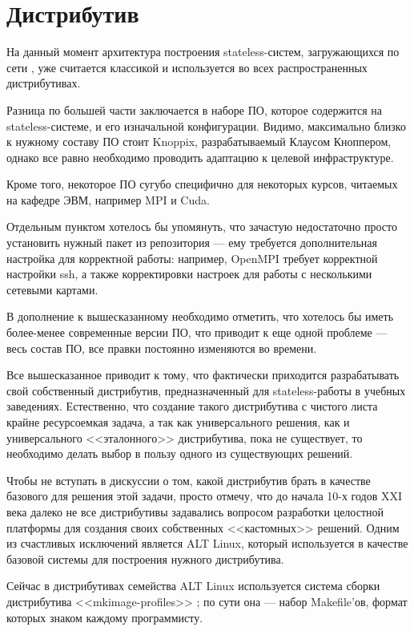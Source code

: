 \documentclass[10pt, a5paper]{article}
\begin{document}
\section*{Дистрибутив}

На данный момент архитектура построения stateless-систем, загружающихся по сети \cite{P01},  уже считается классикой и используется во всех распространенных дистрибутивах.

Разница по большей части заключается в наборе ПО, которое содержится на stateless-системе, и его изначальной конфигурации. Видимо, максимально близко к нужному составу ПО стоит Knoppix, разрабатываемый Клаусом Кноппером, однако все равно необходимо проводить адаптацию к целевой инфраструктуре.

Кроме того, некоторое ПО сугубо специфично для некоторых курсов, читаемых на кафедре ЭВМ, например MPI и Cuda.

Отдельным пунктом хотелось бы упомянуть, что зачастую недостаточно просто установить нужный пакет из репозитория --- ему требуется дополнительная настройка для корректной работы: например, OpenMPI требует корректной настройки ssh, а также корректировки настроек для работы с несколькими сетевыми картами.

В дополнение к вышесказанному необходимо отметить, что хотелось бы иметь более-менее современные версии ПО, что приводит к еще одной проблеме --- весь состав ПО, все правки постоянно изменяются во времени.

Все вышесказанное приводит к тому, что фактически приходится разрабатывать свой собственный дистрибутив, предназначенный для stateless-работы в учебных заведениях. Естественно, что создание такого дистрибутива с чистого листа крайне ресурсоемкая задача, а так как универсального решения, как и универсального <<эталонного>> дистрибутива, пока не существует, то необходимо делать выбор в пользу одного из существующих решений.

Чтобы не вступать в дискуссии о том, какой дистрибутив брать в качестве базового для решения этой задачи, просто отмечу, что до начала 10-х годов XXI века далеко не все дистрибутивы задавались вопросом разработки целостной платформы для создания своих собственных <<кастомных>> решений. Одним из счастливых исключений является ALT Linux, который используется в качестве базовой системы для построения нужного дистрибутива.

Сейчас в дистрибутивах семейства ALT Linux используется система сборки дистрибутива <<mkimage-profiles>> \cite{S01}; по сути она --- набор Makefile’ов, формат которых знаком каждому программисту.
\end{document}

